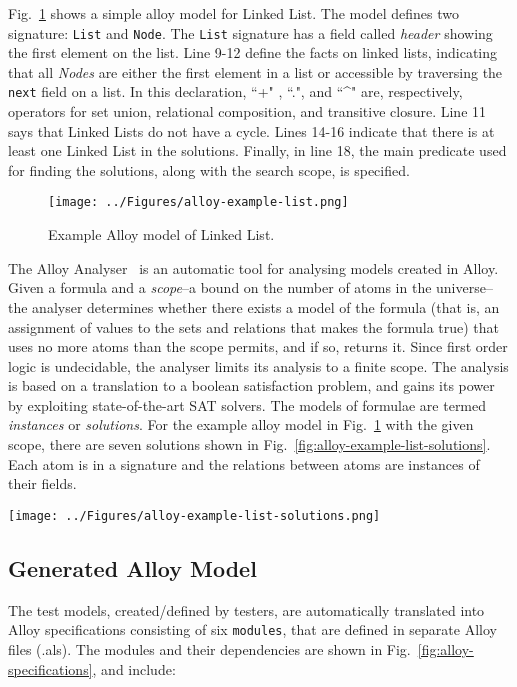 Fig.~\ref{fig:alloy-example-list} shows a simple alloy model for Linked List. The model defines two signature: \texttt{List} and \texttt{Node}. The \texttt{List} signature has a field called \textit{header} showing the first element on the list. Line 9-12 define the facts on linked lists, indicating that all \textit{Nodes} are either the first element in a list or accessible by traversing the \texttt{next} field on a list. In this declaration, ``+" , ``.", and ``\^{}" are, respectively, operators for set union, relational composition, and transitive closure. Line 11 says that Linked Lists do not have a cycle. Lines 14-16 indicate that there is at least one Linked List in the solutions. Finally, in line 18, the main predicate used for finding the solutions, along with the search scope, is specified. 

\begin{figure}[h]
\centering
\texttt{[image: ../Figures/alloy-example-list.png]}
\caption{Example Alloy model of Linked List.}
\label{fig:alloy-example-list}
\end{figure}

The Alloy Analyser~\cite{Jackson2000} is an automatic tool for analysing models created in Alloy. Given a formula and a \textit{scope}--a bound on the number of atoms in the universe--the analyser determines whether there exists a model of the formula (that is, an assignment of values to the sets and relations that makes the formula true) that uses no more atoms than the scope permits, and if so, returns it. Since first order logic is undecidable, the analyser limits its analysis to a finite scope. The analysis is based on a translation to a boolean satisfaction problem, and gains its power by exploiting state-of-the-art SAT solvers. The models of formulae are termed \textit{instances} or \textit{solutions}. For the example alloy model in Fig.~\ref{fig:alloy-example-list} with the given scope, there are seven solutions shown in Fig.~\ref{fig:alloy-example-list-solutions}. Each atom is in a signature and the relations between atoms are instances of their fields.

\begin{figure*}[h]
\centering
\texttt{[image: ../Figures/alloy-example-list-solutions.png]}
\caption{Solutions for the example Alloy model of Linked List.}
\label{fig:alloy-example-list-solutions}
\end{figure*}

\subsection{Generated Alloy Model}
\label{sec:test-generation-execution-alloy-models}
The test models, created/defined by testers, are automatically translated into Alloy specifications consisting of six \texttt{modules}, that are defined in separate Alloy files (.als). The modules and their dependencies are shown in Fig.~\ref{fig:alloy-specifications}, and include:

